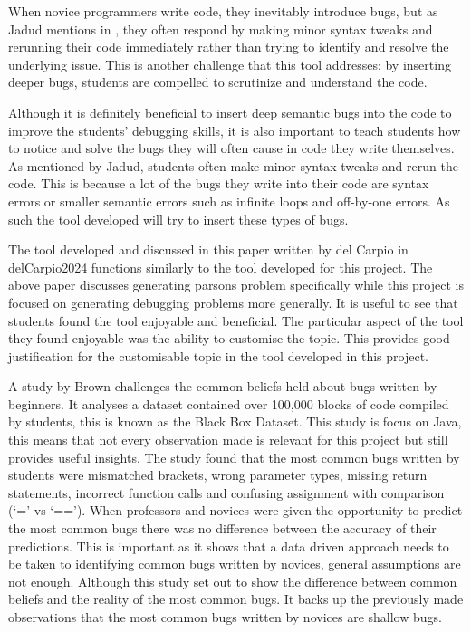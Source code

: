 \documentclass[12pt]{extarticle}
\begin{document}
When novice programmers write code, they inevitably introduce bugs, but as Jadud mentions in \cite{jadud2006}, they often respond by making minor syntax tweaks and rerunning their code immediately rather than trying to identify and resolve the underlying issue. This is another challenge that this tool addresses: by inserting deeper bugs, students are compelled to scrutinize and understand the code.

Although it is definitely beneficial to insert deep semantic bugs into the code to improve the students' debugging skills, it is also important to teach students how to notice and solve the bugs they will often cause in code they write themselves. As mentioned by Jadud, students often make minor syntax tweaks and rerun the code. This is because a lot of the bugs they write into their code are syntax errors or smaller semantic errors such as infinite loops and off-by-one errors. As such the tool developed will try to insert these types of bugs.

The tool developed and discussed in this paper written by del Carpio in {delCarpio2024} functions similarly to the tool developed for this project. The above paper discusses generating parsons problem specifically while this project is focused on generating debugging problems more generally. It is useful to see that students found the tool enjoyable and beneficial. The particular aspect of the tool they found enjoyable was the ability to customise the topic. This provides good justification for the customisable topic in the tool developed in this project.

A study by Brown \cite{Brown2014} challenges the common beliefs held about bugs written by beginners. It analyses a dataset contained over 100,000 blocks of code compiled by students, this is known as the Black Box Dataset. This study is focus on Java, this means that not every observation made is relevant for this project but still provides useful insights. The study found that the most common bugs written by students were mismatched brackets, wrong parameter types, missing return statements, incorrect function calls and confusing assignment with comparison (`=' vs `=='). When professors and novices were given the opportunity to predict the most common bugs there was no difference between the accuracy of their predictions. This is important as it shows that a data driven approach needs to be taken to identifying common bugs written by novices, general assumptions are not enough. Although this study set out to show the difference between common beliefs and the reality of the most common bugs. It backs up the previously made observations that the most common bugs written by novices are shallow bugs.
\end{document}
